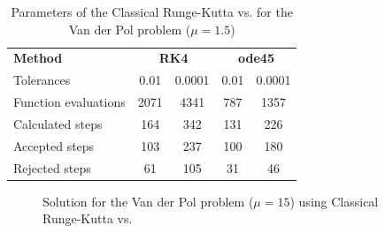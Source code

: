 \begin{table}[H]
    \centering
    \begin{tabular}{@{}l|cc|cc@{}}
    \toprule
    \textbf{Method}      & \multicolumn{2}{c|}{\textbf{RK4}} & \multicolumn{2}{c}{\textbf{ode45}} \\
    Tolerances           & 0.01           & 0.0001           & 0.01            & 0.0001           \\ \midrule
    Function evaluations & 2071           & 4341             & 787             & 1357             \\
    Calculated steps     & 164            & 342              & 131             & 226              \\
    Accepted steps       & 103            & 237              & 100             & 180              \\
    Rejected steps       & 61             & 105              & 31              & 46               \\ \bottomrule
    \end{tabular}
    \caption{Parameters of the Classical Runge-Kutta vs.  for the Van der Pol problem ($\mathit{\mu = 1.5}$)}
    \label{6_6_adaptive_mu_1_5_table}
\end{table}

\begin{figure}[H]
    \centering
    \caption{Solution for the Van der Pol problem ($\mathit{\mu = 15}$) using Classical Runge-Kutta vs. }
    \label{6_6_mu_15}
\end{figure}

